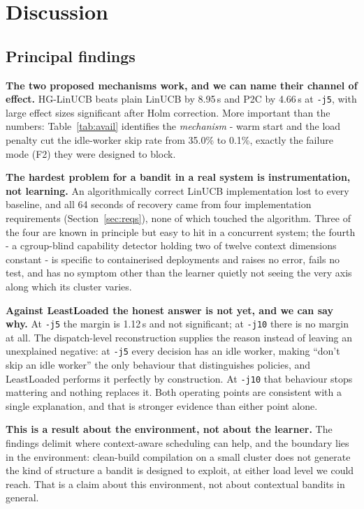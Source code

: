 \documentclass[final,5p,times,twocolumn]{elsarticle}
\begin{document}
\section{Discussion}
\label{sec:discussion}

\subsection{Principal findings}

\textbf{The two proposed mechanisms work, and we can name their channel of effect.} HG-LinUCB beats plain LinUCB by 8.95\,s and P2C by 4.66\,s at \texttt{-j5}, with large effect sizes significant after Holm correction. More important than the numbers: Table~\ref{tab:avail} identifies the \emph{mechanism} - warm start and the load penalty cut the idle-worker skip rate from 35.0\% to 0.1\%, exactly the failure mode (F2) they were designed to block.

\textbf{The hardest problem for a bandit in a real system is instrumentation, not learning.} An algorithmically correct LinUCB implementation lost to every baseline, and all 64 seconds of recovery came from four implementation requirements (Section~\ref{sec:reqs}), none of which touched the algorithm. Three of the four are known in principle but easy to hit in a concurrent system; the fourth - a cgroup-blind capability detector holding two of twelve context dimensions constant - is specific to containerised deployments and raises no error, fails no test, and has no symptom other than the learner quietly not seeing the very axis along which its cluster varies.

\textbf{Against LeastLoaded the honest answer is not yet, and we can say why.} At \texttt{-j5} the margin is 1.12\,s and not significant; at \texttt{-j10} there is no margin at all. The dispatch-level reconstruction supplies the reason instead of leaving an unexplained negative: at \texttt{-j5} every decision has an idle worker, making ``don't skip an idle worker'' the only behaviour that distinguishes policies, and LeastLoaded performs it perfectly by construction. At \texttt{-j10} that behaviour stops mattering and nothing replaces it. Both operating points are consistent with a single explanation, and that is stronger evidence than either point alone.

\textbf{This is a result about the environment, not about the learner.} The findings delimit where context-aware scheduling can help, and the boundary lies in the environment: clean-build compilation on a small cluster does not generate the kind of structure a bandit is designed to exploit, at either load level we could reach. That is a claim about this environment, not about contextual bandits in general.
\end{document}
